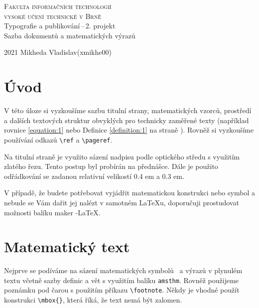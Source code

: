 \documentclass[a4paper,twocolumn,11pt]{article}
\theoremstyle{definition}
\theoremstyle{plain}
\begin{document}
\begin{titlepage}
    \begin{center}
        \Huge
        \textsc{Fakulta informačních technologií\\
                vysoké učení technické v Brně}\\
        \LARGE  
                Typografie a publikování\,--\,2. projekt\\
                Sazba dokumentů a matematických výrazů\\
    \end{center}
    {\Large 2021 \hfill
                Mikheda Vladislav(xmikhe00)}
\end{titlepage}

\section*{Úvod}
V této úloze si vyzkoušíme sazbu titulní strany, matematic\-kých vzorců, prostředí a dalších textových struktur obvyklých pro technicky zaměřené texty (například rovnice \eqref{equation:1}
nebo Definice \ref{definition:1} na straně \pageref{definition:1}). Rovněž si vyzkoušíme používání odkazů \verb|\ref| a \verb|\pageref|.


Na titulní straně je využito sázení nadpisu podle op\-tického středu s využitím zlatého řezu. Tento postup byl
probírán na přednášce. Dále je použito odřádkování se
zadanou relativní velikostí 0.4 em a 0.3 em.


V případě, že budete potřebovat vyjádřit matematickou
konstrukci nebo symbol a nebude se Vám dařit jej nalézt
v samotném \LaTeX u, doporučuji prostudovat možnosti ba\-líku maker \AmS-\LaTeX.

\section{Matematický text}
Nejprve se podíváme na sázení matematických symbolů
~a výrazů v plynulém textu včetně sazby definic a vět s vy\-užitím balíku \texttt{amsthm}. Rovněž použijeme poznámku pod
čarou s použitím příkazu \verb|\footnote|. Někdy je vhodné
použít konstrukci \verb|\mbox{}|, která říká, že text nemá být
zalomen.
\end{document}

